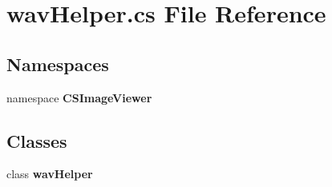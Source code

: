 \section{wav\-Helper.cs File Reference}
\label{wav_helper_8cs}
\subsection*{Namespaces}
\begin{CompactItemize}
\item 
namespace {\bf CSImage\-Viewer}
\end{CompactItemize}
\subsection*{Classes}
\begin{CompactItemize}
\item 
class {\bf wav\-Helper}
\end{CompactItemize}
